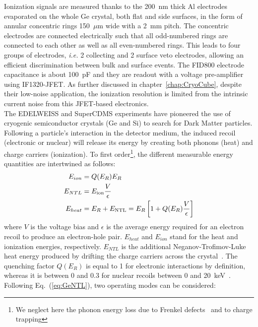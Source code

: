 Ionization signals are measured thanks to the 200~nm thick Al electrodes  evaporated on the whole Ge crystal, both flat and side surfaces, in the form of annular concentric rings 150~$\mu$m wide with a 2~mm pitch. The concentric electrodes are connected electrically such that all odd-numbered rings are connected to each other as well as all even-numbered rings. This leads to four groups of electrodes, {\it i.e.} 2 collecting and 2 surface veto electrodes, allowing an efficient discrimination between bulk and surface events. The FID800 electrode capacitance is about 100~pF and they are readout with a voltage pre-amplifier using IF1320-JFET. As further discussed in chapter~\ref{chap:CryoCube}, despite their low-noise application, the ionization resolution is limited from the intrinsic current noise from this JFET-based electronics.\\



The EDELWEISS and SuperCDMS experiments have pioneered the use of cryogenic semiconductor crystals (Ge and Si) to search for Dark Matter particles. Following a particle's interaction in the detector medium, the induced recoil (electronic or nuclear) will release its energy by creating both phonons (heat) and charge carriers (ionization). 
To first order\footnote{We neglect here the phonon energy loss due to Frenkel defects~\cite{Agnese:2018nbs, Benoit:2006qc} and to charge trapping}, the different measurable energy quantities are intertwined as follows:
\begin{align}
    E_{ion} & = Q(E_R) E_R \\
    E_{NTL} & = E_{\rm ion}\frac{V}{\epsilon} \\
    E_{heat} & = E_R + E_{\rm NTL} = E_R\left[1+Q(E_R)\frac{V}{\epsilon}\right]
    \label{eq:GeNTL}
\end{align}
where $V$ is the voltage bias and $\epsilon$ is the average energy required for an electron recoil to produce an electron-hole pair. $E_{heat}$ and $E_{ion}$ stand for the heat and ionization energies, respectively. $E_{NTL}$ is the additional Neganov-Trofimov-Luke heat energy produced by drifting the charge carriers across the crystal~\cite{Luke,Neganov:1985khw}. The quenching factor $Q(E_R)$ is equal to 1 for electronic interactions by definition, whereas it is between 0 and 0.3 for nuclear recoils between 0 and 20~keV~\cite{Barker:2013nua}. Following Eq.~(\ref{eq:GeNTL}), two operating modes can  be considered:

